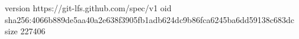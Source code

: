 version https://git-lfs.github.com/spec/v1
oid sha256:4066b889de5aa40a2e638f3905fb1adb624dc9b86fca6245ba6dd59138c683dc
size 227406

